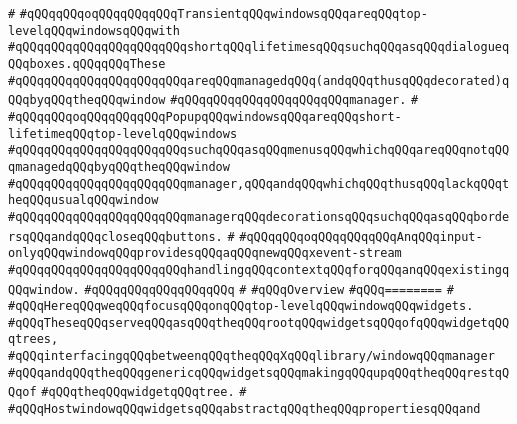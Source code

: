 \verb|#|\newline
\verb|#qQQqqQQqoqQQqqQQqqQQqTransientqQQqwindowsqQQqareqQQqtop-levelqQQqwindowsqQQqwith|\newline
\verb|#qQQqqQQqqQQqqQQqqQQqqQQqshortqQQqlifetimesqQQqsuchqQQqasqQQqdialogueqQQqboxes.qQQqqQQqThese|\newline
\verb|#qQQqqQQqqQQqqQQqqQQqqQQqareqQQqmanagedqQQq(andqQQqthusqQQqdecorated)qQQqbyqQQqtheqQQqwindow|\newline
\verb|#qQQqqQQqqQQqqQQqqQQqqQQqmanager.|\newline
\verb|#|\newline
\verb|#qQQqqQQqoqQQqqQQqqQQqPopupqQQqwindowsqQQqareqQQqshort-lifetimeqQQqtop-levelqQQqwindows|\newline
\verb|#qQQqqQQqqQQqqQQqqQQqqQQqsuchqQQqasqQQqmenusqQQqwhichqQQqareqQQqnotqQQqmanagedqQQqbyqQQqtheqQQqwindow|\newline
\verb|#qQQqqQQqqQQqqQQqqQQqqQQqmanager,qQQqandqQQqwhichqQQqthusqQQqlackqQQqtheqQQqusualqQQqwindow|\newline
\verb|#qQQqqQQqqQQqqQQqqQQqqQQqmanagerqQQqdecorationsqQQqsuchqQQqasqQQqbordersqQQqandqQQqcloseqQQqbuttons.|\newline
\verb|#|\newline
\verb|#qQQqqQQqoqQQqqQQqqQQqAnqQQqinput-onlyqQQqwindowqQQqprovidesqQQqaqQQqnewqQQqxevent-stream|\newline
\verb|#qQQqqQQqqQQqqQQqqQQqqQQqhandlingqQQqcontextqQQqforqQQqanqQQqexistingqQQqwindow.|\newline
\verb|#qQQqqQQqqQQqqQQqqQQq|\newline
\verb|#|\newline
\verb|#qQQqOverview|\newline
\verb|#qQQq========|\newline
\verb|#|\newline
\verb|#qQQqHereqQQqweqQQqfocusqQQqonqQQqtop-levelqQQqwindowqQQqwidgets.|\newline
\verb|#qQQqTheseqQQqserveqQQqasqQQqtheqQQqrootqQQqwidgetsqQQqofqQQqwidgetqQQqtrees,|\newline
\verb|#qQQqinterfacingqQQqbetweenqQQqtheqQQqXqQQqlibrary/windowqQQqmanager|\newline
\verb|#qQQqandqQQqtheqQQqgenericqQQqwidgetsqQQqmakingqQQqupqQQqtheqQQqrestqQQqof|\newline
\verb|#qQQqtheqQQqwidgetqQQqtree.|\newline
\verb|#|\newline
\verb|#qQQqHostwindowqQQqwidgetsqQQqabstractqQQqtheqQQqpropertiesqQQqand|\newline
